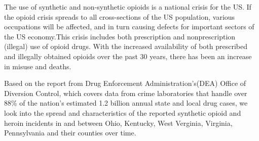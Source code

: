 The use of synthetic and non-synthetic opioids is a national crisis for the US. If the opioid crisis spreads to all cross-sections of the US population, various occupations will be affected, and in turn causing defects for important sectors of the US economy.This crisis includes both prescription and nonprescription (illegal) use of opioid drugs.\cite{1} With the increased availability of both prescribed and illegally obtained opioids over the past 30 years, there has been an increase in misuse and deaths.\cite{2}

Based on the report from Drug Enforcement Administration's(DEA) Office of Diversion Control, which covers data from crime laboratories that handle over 88\% of the nation's estimated 1.2 billion annual state and local drug cases, we look into the spread and characteristics of the reported synthetic opioid and heroin incidents in and between Ohio, Kentucky, West Verginia, Virginia, Pennsylvania and their counties over time.


